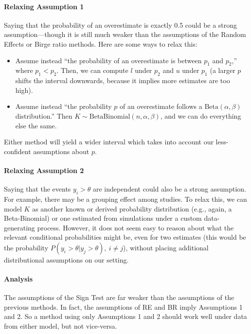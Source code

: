 \documentclass[letterpaper,12pt]{article}
\begin{document}
\paragraph{Relaxing Assumption 1}\label{relaxing-assumption-1}

Saying that the probability of an overestimate is exactly 0.5 could be a strong assumption---though it is still much weaker than the assumptions of the Random Effects or Birge ratio methods. Here are some ways to relax this:

\begin{itemize}
\item
  Assume instead ``the probability of an overestimate is between $p_1$ and $p_2$,'' where $p_1<p_2$. Then, we can compute $l$ under $p_2$ and $u$ under $p_1$ (a larger $p$ shifts the interval downwards, because it implies more estimates are too high).
\item
  Assume instead ``the probability $p$ of an overestimate follows a $\mathrm{Beta}(\alpha,\beta)$ distribution.'' Then $K\sim\mathrm{BetaBinomial}(n,\alpha,\beta)$, and we can do everything else the same.
\end{itemize}

Either method will yield a wider interval which takes into account our less-confident assumptions about $p$.

\paragraph{Relaxing Assumption 2}
\label{sec:binom-ass-2}

Saying that the events $y_i>\theta$ are independent could also be a strong assumption. For example, there may be a grouping effect among studies. To relax this, we can model $K$ as another known or derived probability distribution (e.g., again, a Beta-Binomial) or one estimated from simulations under a custom data-generating process. However, it does not seem easy to reason about what the relevant conditional probabilities might be, even for two estimates (this would be the probability $P(y_i>\theta|y_j>\theta),\ i\neq j$), without placing additional distributional assumptions on our setting.

\paragraph{Analysis}\label{analysis}

The assumptions of the Sign Test are far weaker than the assumptions of the previous methods. In fact, the assumptions of RE and BR imply Assumptions 1 and 2. So a method using only Assumptions 1 and 2 should work well under data from either model, but not vice-versa.
\end{document}
